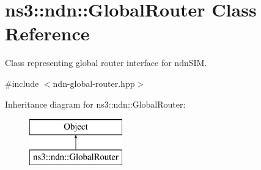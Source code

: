 \hypertarget{classns3_1_1ndn_1_1GlobalRouter}{}\section{ns3\+:\+:ndn\+:\+:Global\+Router Class Reference}
\label{classns3_1_1ndn_1_1GlobalRouter}


Class representing global router interface for ndn\+S\+IM.  




{\ttfamily \#include $<$ndn-\/global-\/router.\+hpp$>$}

Inheritance diagram for ns3\+:\+:ndn\+:\+:Global\+Router\+:\begin{figure}[H]
\begin{center}
\leavevmode
\includegraphics[height=2.000000cm]{classns3_1_1ndn_1_1GlobalRouter}
\end{center}
\end{figure}
